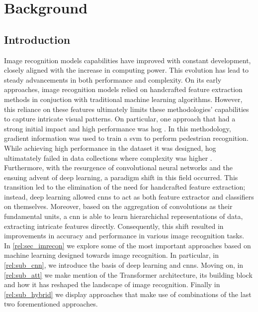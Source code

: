 \chapter{Background}
\label{ch:rel}
\chaptertoc{}
\section{Introduction}
Image recognition models capabilities have improved with constant development, 
closely aligned with the increase in computing power. This evolution has lead to steady 
advancements in both performance and complexity. On its early approaches, image recognition models 
relied on handcrafted feature extraction methods  in conjuction with traditional machine learning 
algorithms. However, this reliance on these features ultimately limits these methodologies' 
capabilities to capture intricate visual patterns.
On particular, one approach that had a strong initial impact and high performance was \gls{hog} 
\autocite{dalal2005histograms}. In this methodology, gradient information was used to train a 
\gls{svm} to perform pedestrian recognition. While achieving high performance in the dataset it was 
designed, \gls{hog} ultimatately failed in data collections where complexity was higher 
\autocite{5975165}.\\
Furthermore, with the resurgence of convolutional neural networks and the ensuing advent of 
deep learning, a paradigm shift in this field occurred. This transition led to the elimination of 
the need for handcrafted feature extraction; instead, deep learning allowed \glspl{cnn} to act 
as both feature extractor and classifiers on themselves. Moreover, based on the aggregation of 
convolutions as their fundamental units, a \gls{cnn} is able to learn hierarchichal 
representations of data, extracting intricate features directly. 
Consequently, this shift resulted in improvements in accuracy and performance in various image 
recognition tasks. \\

\noindent In \autoref{rel:sec_imrecon} we explore some of the most important approaches based 
on machine learning designed towards image recognition. In particular, in \autoref{rel:sub_cnn}, we 
introduce the basis of deep learning and \glspl{cnn}. Moving on, in \autoref{rel:sub_att} we make 
mention of the Transformer architecture, its building block and how it has reshaped the landscape 
of image recognition. Finally in \autoref{rel:sub_hybrid} we display approaches that make use of 
combinations of the last two forementioned approaches.\\


